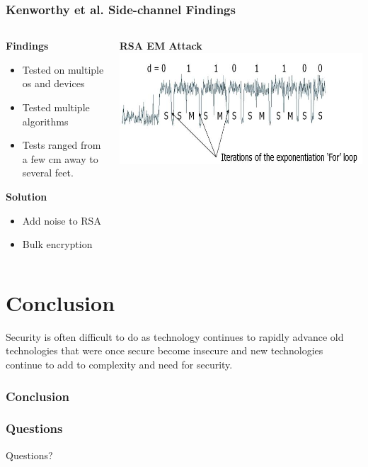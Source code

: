 \documentclass{beamer}
\begin{document}
		\begin{frame}
		\frametitle{Kenworthy et al. Side-channel Findings}
		\begin{columns}[T]
		\begin{column}{.45\textwidth}
		\textbf{Findings}
		\begin{itemize}
		\item Tested on multiple os and devices
		\item Tested multiple algorithms
		\item Tests ranged from a few cm away to several feet.
		\end{itemize}
		\textbf{Solution}
		\begin{itemize}
		\item Add noise to RSA
		\item Bulk encryption
		\end{itemize}
		 
		
		\end{column}
		\begin{column}{.45\textwidth}
		\textbf{RSA EM Attack}
		\includegraphics[scale=.3]{Images/RSA.jpg}
		\end{column}
		\end{columns}
	
		
			
		\end{frame}
\section{Conclusion}
	\begin{frame}
		Security is often difficult to do as technology continues to rapidly advance old technologies that were once secure become insecure and new technologies continue to add to complexity and need for security.
		\frametitle{Conclusion}
		\end{frame}	
		
		\begin{frame}
		\frametitle{Questions}
			\begin{center}
			\Huge Questions?
			\end{center}
		\end{frame}	
\end{document}
